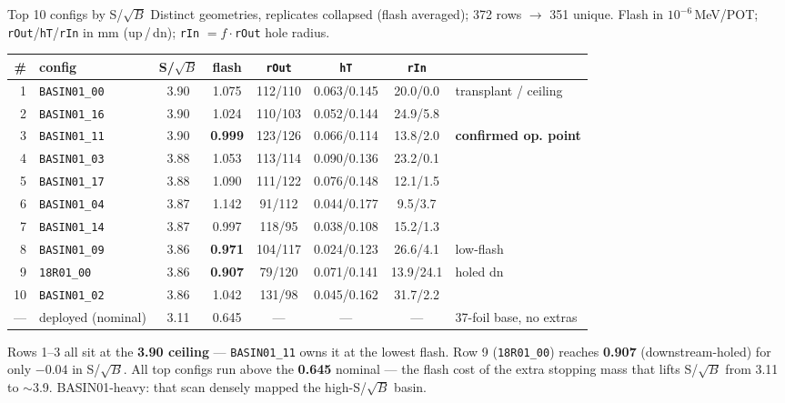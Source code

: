 \documentclass[aspectratio=169,10pt]{beamer}
\begin{document}
\begin{frame}{Top 10 configs by S/$\sqrt{B}$}
\scriptsize
Distinct geometries, replicates collapsed (flash averaged); 372 rows $\to$ 351 unique.
Flash in $10^{-6}$\,MeV/POT; \texttt{rOut}/\texttt{hT}/\texttt{rIn} in mm (up\,/\,dn); \texttt{rIn} $= f\cdot$\texttt{rOut} hole radius.
\vspace{0.4em}
\begin{center}
\begin{tabular}{@{}rlcccccl@{}}
\toprule
\# & config & S/$\sqrt{B}$ & flash & \texttt{rOut} & \texttt{hT} & \texttt{rIn} & \\
\midrule
1 & \texttt{BASIN01\_00} & 3.90 & 1.075 & 112/110 & 0.063/0.145 & 20.0/0.0 & transplant / ceiling \\
2 & \texttt{BASIN01\_16} & 3.90 & 1.024 & 110/103 & 0.052/0.144 & 24.9/5.8 &  \\
3 & \texttt{BASIN01\_11} & 3.90 & \textbf{0.999} & 123/126 & 0.066/0.114 & 13.8/2.0 & \textbf{confirmed op. point} \\
4 & \texttt{BASIN01\_03} & 3.88 & 1.053 & 113/114 & 0.090/0.136 & 23.2/0.1 &  \\
5 & \texttt{BASIN01\_17} & 3.88 & 1.090 & 111/122 & 0.076/0.148 & 12.1/1.5 &  \\
6 & \texttt{BASIN01\_04} & 3.87 & 1.142 & 91/112 & 0.044/0.177 & 9.5/3.7 &  \\
7 & \texttt{BASIN01\_14} & 3.87 & 0.997 & 118/95 & 0.038/0.108 & 15.2/1.3 &  \\
8 & \texttt{BASIN01\_09} & 3.86 & \textbf{0.971} & 104/117 & 0.024/0.123 & 26.6/4.1 & low-flash \\
9 & \texttt{18R01\_00} & 3.86 & \textbf{0.907} & 79/120 & 0.071/0.141 & 13.9/24.1 & holed dn \\
10 & \texttt{BASIN01\_02} & 3.86 & 1.042 & 131/98 & 0.045/0.162 & 31.7/2.2 &  \\
\midrule
--- & deployed (nominal) & 3.11 & 0.645 & --- & --- & --- & 37-foil base, no extras \\
\bottomrule
\end{tabular}
\end{center}
\vspace{0.4em}
\footnotesize
Rows 1--3 all sit at the \textbf{3.90 ceiling} --- \texttt{BASIN01\_11} owns it at the lowest flash.
Row 9 (\texttt{18R01\_00}) reaches \textbf{0.907} (downstream-holed) for only $-0.04$ in S/$\sqrt{B}$.
All top configs run above the \textbf{0.645} nominal --- the flash cost of the extra stopping mass
that lifts S/$\sqrt{B}$ from 3.11 to $\sim$3.9. BASIN01-heavy: that scan densely mapped the high-S/$\sqrt{B}$ basin.
\end{frame}
\end{document}
